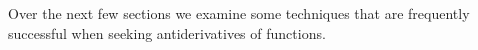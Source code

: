 Over the next few sections we examine some techniques that are
frequently successful when seeking antiderivatives of
functions. %